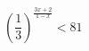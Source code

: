\begin{ex}[type=inequality]
	\begin{condition}
	\( \left( \dfrac{1}{3} \right)^{\frac{3x+2}{1-x}}<81 \)
	\end{condition}
\end{ex}
